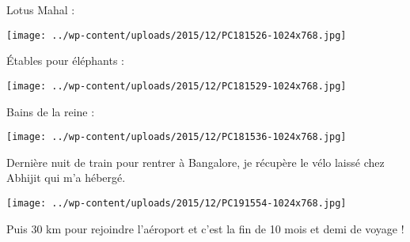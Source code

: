 Lotus Mahal :
\begin{center} \texttt{[image: ../wp-content/uploads/2015/12/PC181526-1024x768.jpg]} \end{center}
\pagebreak

Étables pour éléphants : 
\begin{center} \texttt{[image: ../wp-content/uploads/2015/12/PC181529-1024x768.jpg]} \end{center}

Bains de la reine : 
\begin{center} \texttt{[image: ../wp-content/uploads/2015/12/PC181536-1024x768.jpg]} \end{center}
\pagebreak

Dernière nuit de train pour rentrer à Bangalore, je récupère le vélo laissé chez Abhijit qui m'a hébergé. 
\begin{center} \texttt{[image: ../wp-content/uploads/2015/12/PC191554-1024x768.jpg]} \end{center}

Puis 30 km pour rejoindre l'aéroport et c'est la fin de 10 mois et demi de voyage !
